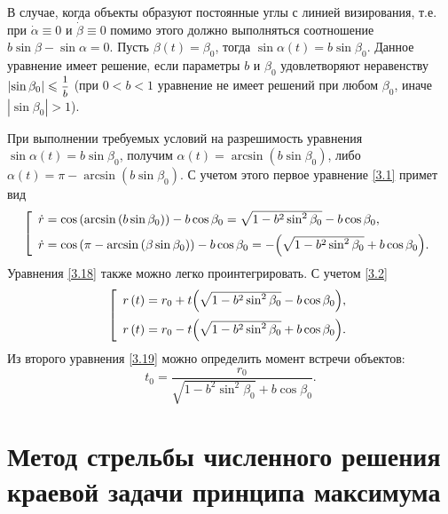 \documentclass[a4paper,12pt, openany]{book}
\theoremstyle{plain} %
\theoremstyle{definition} %
\theoremstyle{remark} %
\numberwithin{equation}{chapter}
\begin{document}
{В случае, когда объекты образуют постоянные углы с линией визирования, т.е. при $\dot\alpha \equiv 0$ и $\dot\beta \equiv 0$ помимо этого должно выполняться соотношение $b\sin\beta - \sin\alpha = 0$. Пусть $\beta(t) = \beta_0$, тогда $\sin\alpha(t) = b\sin\beta_0$. Данное уравнение имеет решение, если параметры $b$ и $\beta_0$ удовлетворяют неравенству $
\left| {\sin \beta _0 } \right| \leqslant \mfrac{1}
{b}
$ (при $0<b<1$ уравнение не имеет решений при любом $\beta_0$, иначе $\left|\sin\beta_0\right| > 1$).

При выполнении требуемых условий на разрешимость уравнения $\sin\alpha(t) = b\sin\beta_0$, получим $
\alpha \left( t \right) = \arcsin \left( {b\sin \beta _0 } \right)$, либо $
\alpha \left( t \right) = \pi  - \arcsin \left( {b\sin \beta _0 } \right)
$. С учетом этого первое уравнение \eqref{3.1} примет вид
\begin{equation}\label{3.18}
\left[
\begin{array}{*{20}l}
  \dot r = \cos \left( {\arcsin \left( {b\sin \beta _0 } \right)} \right) - b\cos \beta _0  = \sqrt {1 - b^2 \sin ^2 \beta _0 }  - b\cos \beta _0 , \hfill \vspace{0.2cm} \\
  \dot r = \cos \left( {\pi  - \arcsin \left( {\beta \sin \beta _0 } \right)} \right) - b\cos \beta _0  =  - \Big( {\sqrt {1 - b^2 \sin ^2 \beta _0 }  + b\cos \beta _0 } \Big). 
\end{array}
\right.
\end{equation}
Уравнения \eqref{3.18} также можно легко проинтегрировать. С учетом \eqref{3.2}
\begin{equation}\label{3.19}
\left[
\begin{array}{*{20}l}
  r\left( t \right) = r_0  + t\Big( {\sqrt {1 - b^2 \sin ^2 \beta _0 }  - b\cos \beta _0 } \Big), \hfill \vspace{0.2cm} \\
  r\left( t \right) = r_0  - t\Big( {\sqrt {1 - b^2 \sin ^2 \beta _0 }  + b\cos \beta _0 } \Big). 
\end{array}
\right.
\end{equation}
\newpage
Из второго уравнения \eqref{3.19} можно определить момент встречи объектов:
\[
t_0  = \frac{{r_0 }}
{{\sqrt {1 - b^2 \sin ^2 \beta _0 }  + b\cos \beta _0 }}.
\]



\section{Метод стрельбы численного решения краевой задачи принципа максимума}

}
\end{document}
